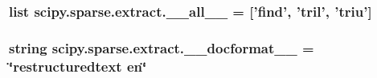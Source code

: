 \subsubsection[{\+\_\+\+\_\+all\+\_\+\+\_\+}]{\setlength{\rightskip}{0pt plus 5cm}list scipy.\+sparse.\+extract.\+\_\+\+\_\+all\+\_\+\+\_\+ = \mbox{[}'{\bf find}', '{\bf tril}', '{\bf triu}'\mbox{]}}\label{namespacescipy_1_1sparse_1_1extract_aa3aea85848a333e36eeec638e156d6a1}
\hypertarget{namespacescipy_1_1sparse_1_1extract_a5df11b961e462d2e33ae77a27a533128}{}
\subsubsection[{\+\_\+\+\_\+docformat\+\_\+\+\_\+}]{\setlength{\rightskip}{0pt plus 5cm}string scipy.\+sparse.\+extract.\+\_\+\+\_\+docformat\+\_\+\+\_\+ = \char`\"{}restructuredtext en\char`\"{}}\label{namespacescipy_1_1sparse_1_1extract_a5df11b961e462d2e33ae77a27a533128}
